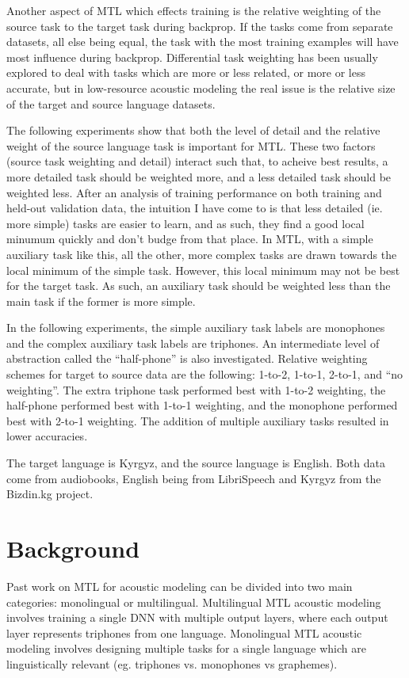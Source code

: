 \documentclass[a4paper]{article}
\begin{document}
Another aspect of MTL which effects training is the relative weighting of the source task to the target task during backprop. If the tasks come from separate datasets, all else being equal, the task with the most training examples will have most influence during backprop. Differential task weighting has been usually explored to deal with tasks which are more or less related, or more or less accurate, but in low-resource acoustic modeling the real issue is the relative size of the target and source language datasets.


The following experiments show that both the level of detail and the relative weight of the source language task is important for MTL. These two factors (source task weighting and detail) interact such that, to acheive best results, a more detailed task should be weighted more, and a less detailed task should be weighted less. After an analysis of training performance on both training and held-out validation data, the intuition I have come to is that less detailed (ie. more simple) tasks are easier to learn, and as such, they find a good local minumum quickly and don't budge from that place. In MTL, with a simple auxiliary task like this, all the other, more complex tasks are drawn towards the local minimum of the simple task. However, this local minimum may not be best for the target task. As such, an auxiliary task should be weighted less than the main task if the former is more simple.

In the following experiments, the simple auxiliary task labels are monophones and the complex auxiliary task labels are triphones. An intermediate level of abstraction called the ``half-phone'' is also investigated. Relative weighting schemes for target to source data are the following: 1-to-2, 1-to-1, 2-to-1, and ``no weighting''. The extra triphone task performed best with 1-to-2 weighting, the half-phone performed best with 1-to-1 weighting, and the monophone performed best with 2-to-1 weighting. The addition of multiple auxiliary tasks resulted in lower accuracies.

The target language is Kyrgyz, and the source language is English. Both data come from audiobooks, English being from LibriSpeech and Kyrgyz from the Bizdin.kg project.




\section{Background}

Past work on MTL for acoustic modeling can be divided into two main categories: monolingual or multilingual. Multilingual MTL acoustic modeling involves training a single DNN with multiple output layers, where each output layer represents triphones from one language. Monolingual MTL acoustic modeling involves designing multiple tasks for a single language which are linguistically relevant (eg. triphones vs. monophones vs graphemes). 
\end{document}
